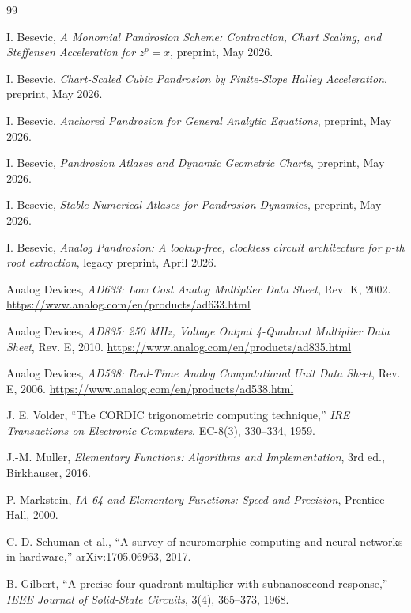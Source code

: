 \documentclass[11pt]{article}
\begin{document}
\begin{thebibliography}{99}

I. Besevic, \emph{A Monomial Pandrosion Scheme: Contraction, Chart Scaling,
and Steffensen Acceleration for \(z^p=x\)}, preprint, May 2026.

I. Besevic, \emph{Chart-Scaled Cubic Pandrosion by Finite-Slope Halley
Acceleration}, preprint, May 2026.

I. Besevic, \emph{Anchored Pandrosion for General Analytic Equations},
preprint, May 2026.

I. Besevic, \emph{Pandrosion Atlases and Dynamic Geometric Charts}, preprint,
May 2026.

I. Besevic, \emph{Stable Numerical Atlases for Pandrosion Dynamics}, preprint,
May 2026.

I. Besevic, \emph{Analog Pandrosion: A lookup-free, clockless circuit
architecture for \(p\)-th root extraction}, legacy preprint, April 2026.

Analog Devices, \emph{AD633: Low Cost Analog Multiplier Data Sheet},
Rev. K, 2002.
\url{https://www.analog.com/en/products/ad633.html}

Analog Devices, \emph{AD835: 250 MHz, Voltage Output 4-Quadrant Multiplier
Data Sheet}, Rev. E, 2010.
\url{https://www.analog.com/en/products/ad835.html}

Analog Devices, \emph{AD538: Real-Time Analog Computational Unit Data Sheet},
Rev. E, 2006.
\url{https://www.analog.com/en/products/ad538.html}

J. E. Volder, ``The CORDIC trigonometric computing technique,''
\emph{IRE Transactions on Electronic Computers}, EC-8(3), 330--334, 1959.

J.-M. Muller, \emph{Elementary Functions: Algorithms and Implementation},
3rd ed., Birkhauser, 2016.

P. Markstein, \emph{IA-64 and Elementary Functions: Speed and Precision},
Prentice Hall, 2000.

C. D. Schuman et al., ``A survey of neuromorphic computing and neural
networks in hardware,'' arXiv:1705.06963, 2017.

B. Gilbert, ``A precise four-quadrant multiplier with subnanosecond response,''
\emph{IEEE Journal of Solid-State Circuits}, 3(4), 365--373, 1968.

\end{thebibliography}
\end{document}
